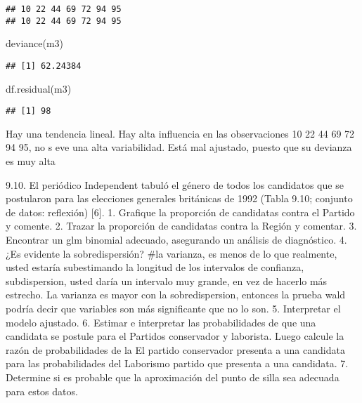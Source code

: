 \documentclass[
]{article}
\newenvironment{Shaded}{\begin{snugshade}}{\end{snugshade}}
\newcommand{\FunctionTok}[1]{\textcolor[rgb]{0.00,0.00,0.00}{#1}}
\newcommand{\NormalTok}[1]{#1}
\begin{document}
\begin{verbatim}
## 10 22 44 69 72 94 95 
## 10 22 44 69 72 94 95
\end{verbatim}

\begin{Shaded}
\begin{Highlighting}[]
\FunctionTok{deviance}\NormalTok{(m3)}
\end{Highlighting}
\end{Shaded}

\begin{verbatim}
## [1] 62.24384
\end{verbatim}

\begin{Shaded}
\begin{Highlighting}[]
\FunctionTok{df.residual}\NormalTok{(m3)}
\end{Highlighting}
\end{Shaded}

\begin{verbatim}
## [1] 98
\end{verbatim}

Hay una tendencia lineal. Hay alta influencia en las observaciones 10 22
44 69 72 94 95, no s eve una alta variabilidad. Está mal ajustado,
puesto que su devianza es muy alta

9.10. El periódico Independent tabuló el género de todos los candidatos
que se postularon para las elecciones generales británicas de 1992
(Tabla 9.10; conjunto de datos: reflexión) {[}6{]}. 1. Grafique la
proporción de candidatas contra el Partido y comente. 2. Trazar la
proporción de candidatas contra la Región y comentar. 3. Encontrar un
glm binomial adecuado, asegurando un análisis de diagnóstico. 4. ¿Es
evidente la sobredispersión? \#la varianza, es menos de lo que
realmente, usted estaría subestimando la longitud de los intervalos de
confianza, subdispersion, usted daría un intervalo muy grande, en vez de
hacerlo más estrecho. La varianza es mayor con la sobredispersion,
entonces la prueba wald podría decir que variables son más significante
que no lo son. 5. Interpretar el modelo ajustado. 6. Estimar e
interpretar las probabilidades de que una candidata se postule para el
Partidos conservador y laborista. Luego calcule la razón de
probabilidades de la El partido conservador presenta a una candidata
para las probabilidades del Laborismo partido que presenta a una
candidata. 7. Determine si es probable que la aproximación del punto de
silla sea adecuada para estos datos.
\end{document}
